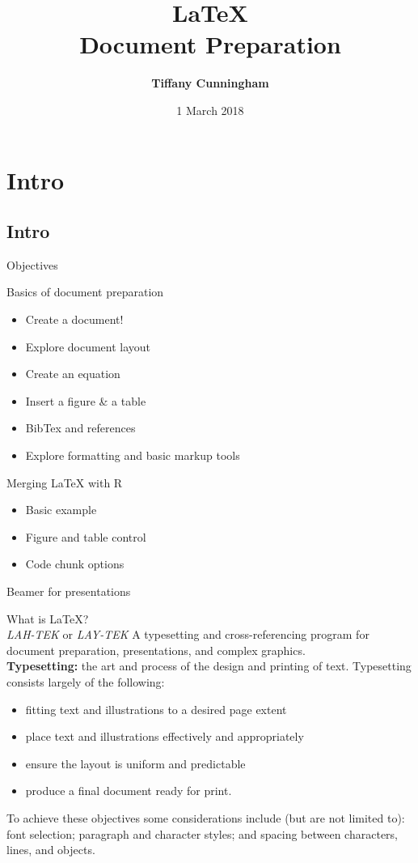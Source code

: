 \documentclass[xcolor=dvipsnames]{beamer}
\title{\Huge{\textbf{\LaTeX\\ Document Preparation}}}
\subtitle{}
\author{\textbf{\large{Tiffany Cunningham}}}
\institute{\normalsize{MA Division of Marine Fisheries}}
\date{\normalsize{1 March 2018}}
\begin{document}
\begin{frame}
\titlepage
\end{frame}

\section{Intro}
\subsection{Intro}

\begin{frame}{\LARGE{Objectives}}
\begin{itemize}
\large{
\item Basics of document preparation	
\begin{itemize}
\item Create a document!
\item Explore document layout
\item Create an equation
\item Insert a figure \& a table
\item BibTex and references
\item Explore formatting and basic markup tools
\end{itemize}
\item Merging LaTeX with R
\begin{itemize}
	\item Basic example
	\item Figure and table control
	\item Code chunk options
\end{itemize}
\item Beamer for presentations}
\begin{center}

\end{center}
\end{itemize}
\end{frame}

\begin{frame}{\LARGE{What is \LaTeX?}\\ \normalsize{\textit{LAH-TEK} or \textit{LAY-TEK}}}
A typesetting and cross-referencing program for document preparation, presentations, and complex graphics.\\[.5cm]

\textbf{Typesetting:} the art and process of the design and printing of text. Typesetting consists largely of the following:
\begin{itemize}
	\item fitting text and illustrations to a desired page extent
	\item place text and illustrations effectively and appropriately
	\item ensure the layout is uniform and predictable 
	\item produce a final document ready for print.
\end{itemize}
To achieve these objectives some considerations include (but are not limited to): font selection; paragraph and character styles; and spacing between characters, lines, and objects. 
\end{frame}
\end{document}
